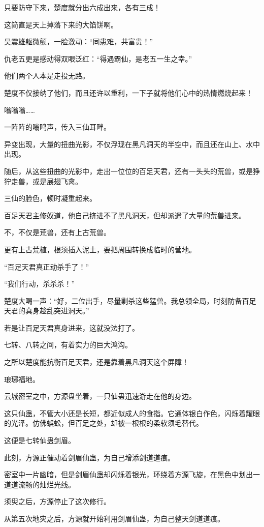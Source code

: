 \begin{this_body}
只要防守下来，楚度就分出六成出来，各有三成！

这简直是天上掉落下来的大馅饼啊。

昊震雄躯微颤，一脸激动：“同患难，共富贵！”

仇老五更是感动得双眼泛红：“得遇霸仙，是老五一生之幸。”

他们两个人本是走投无路。

楚度不仅接纳了他们，而且还许以重利，一下子就将他们心中的热情燃烧起来！

嗡嗡嗡……

一阵阵的嗡鸣声，传入三仙耳畔。

异变出现，大量的扭曲光影，不仅浮现在黑凡洞天的半空中，而且还在山上、水中出现。

随后，从这些扭曲的光影中，走出一位位的百足天君，还有一头头的荒兽，或是狰狞走兽，或是展翅飞禽。

三仙的脸色，顿时凝重起来。

百足天君主修奴道，他自己挤进不了黑凡洞天，但却派遣了大量的荒兽进来。

不，不仅是荒兽，还有上古荒兽。

更有上古荒植，根须插入泥土，要把周围转换成临时的营地。

“百足天君真正动杀手了！”

“我们行动，杀杀杀！”

楚度大喝一声：“好，二位出手，尽量剿杀这些猛兽。我总领全局，时刻防备百足天君的真身趁乱突进洞天。”

若是让百足天君真身进来，这就没法打了。

七转、八转之间，有着实力的巨大鸿沟。

之所以楚度能抗衡百足天君，还是靠着黑凡洞天这个屏障！

琅琊福地。

云城密室之中，方源盘坐着，一只仙蛊迅速游走在他的身边。

这只仙蛊，不管大小还是长短，都近似成人的食指。它通体银白作色，闪烁着耀眼的光泽。仿佛蜈蚣，但百足之处，却被一根根的柔软须毛替代。

这便是七转仙蛊剑眉。

此刻，方源正催动着剑眉仙蛊，为自己增添剑道道痕。

密室中一片幽暗，但是剑眉仙蛊却闪烁着银光，环绕着方源飞旋，在黑色中划出一道道流畅的灿烂光线。

须臾之后，方源停止了这次修行。

从第五次地灾之后，方源就开始利用剑眉仙蛊，为自己整天剑道道痕。


\end{this_body}
